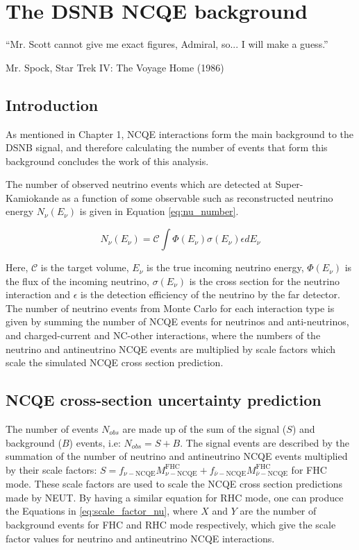 \chapter{The DSNB NCQE background}
\epigraph{``Mr. Scott cannot give me exact figures, Admiral, so... I will make a guess.''}{Mr. Spock, Star Trek IV: The Voyage Home (1986)}
\label{chp:ncqe_xsec}


\section{Introduction}

As mentioned in Chapter 1, NCQE interactions form the main background to the DSNB signal, and therefore calculating the number of events that form this background concludes the work of this analysis. 

The number of observed neutrino events which are detected at Super-Kamiokande as a function of some observable such as reconstructed neutrino energy $N_{\nu}(E_{\nu})$ is given in Equation \ref{eq:nu_number}.

\begin{equation}
    N_\nu(E_\nu)=\mathcal{C} \int \Phi\left(E_\nu\right) \sigma\left(E_\nu\right) \epsilon d E_\nu
\label{eq:nu_number}
\end{equation}

Here, $\mathcal{C}$ is the target volume, $E_{\nu}$ is the true incoming neutrino energy, $\Phi(E_{\nu})$ is the flux of the incoming neutrino, $\sigma(E_{\nu})$ is the cross section for the neutrino interaction and $\epsilon$ is the detection efficiency of the neutrino by the far detector. The number of neutrino events from Monte Carlo for each interaction type is given by summing the number of NCQE events for neutrinos and anti-neutrinos, and charged-current and NC-other interactions, where the numbers of the neutrino and antineutrino NCQE events are multiplied by scale factors which scale the simulated NCQE cross section prediction.




\section{NCQE cross-section uncertainty prediction}


The number of events $N_{obs}$ are made up of the sum of the signal ($S$) and background ($B$) events, i.e: $N_{obs} = S + B$. The signal events are described by the summation of the number of neutrino and antineutrino NCQE events multiplied by their scale factors: $S  = f_{\nu-\mathrm{NCQE}} M_{\nu-\mathrm{NCQE}}^{\mathrm{FHC}}+f_{\bar{\nu}-\mathrm{NCQE}} M_{\bar{\nu}-\mathrm{NCQE}}^{\mathrm{FHC}}$ for FHC mode. These scale factors are used to scale the NCQE cross section predictions made by NEUT. By having a similar equation for RHC mode, one can produce the Equations in \ref{eq:scale_factor_nu}, where $X$ and $Y$ are the number of background events for FHC and RHC mode respectively, which give the scale factor values for neutrino and antineutrino NCQE interactions. 

